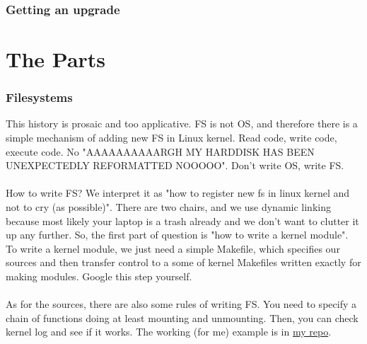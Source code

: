 \documentclass[14pt]{extarticle}
\begin{document}
\section{Getting an upgrade}



\part{The Parts}
\section{Filesystems}
This history is prosaic and too applicative. FS is not OS, and therefore
there is a simple mechanism of adding new FS in Linux kernel. 
Read code, write code, execute code. No "AAAAAAAAAARGH MY HARDDISK HAS 
BEEN UNEXPECTEDLY REFORMATTED NOOOOO". Don't write OS, write FS. 
\\\\
How to write FS? We interpret it as "how to register new fs in linux kernel
and not to cry (as possible)". There are two chairs, and we use dynamic 
linking because most likely your laptop is a trash already and we don't 
want to clutter it up any further. So, the first part of question is 
"how to write a kernel module".   
\\
To write a kernel module, we just need a simple Makefile, which 
specifies our sources and then transfer control to a some of kernel 
Makefiles written exactly for making modules. Google this step yourself.
\\\\
As for the sources, there are also some rules of writing FS. You need 
to specify a chain of functions doing at least mounting and unmounting.
Then, you can check kernel log and see if it works. The working (for me)
example is in \href{https://github.com/x6x4/custom_fs}{my repo}.
\end{document}
